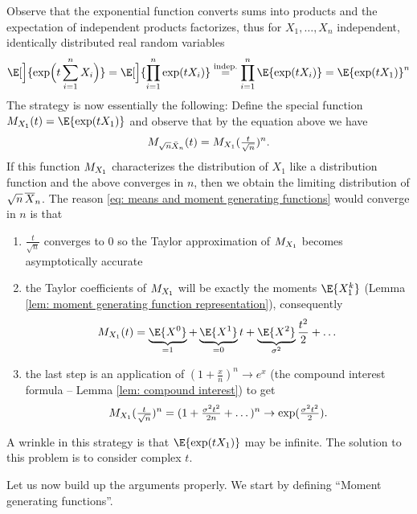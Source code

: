Observe that the exponential function converts sums into products and the
expectation of independent products factorizes, thus for \(X_1,\dots, X_n\)
independent, identically distributed real random variables
\[
    \E[\Big]{\exp\Bigl(t\sum_{i=1}^n X_i\Bigr)} = \E[\Big]{\prod_{i=1}^n \exp(tX_i)}
    \overset{\text{indep.}}= \prod_{i=1}^n \E{\exp(tX_i)}
    = \E{\exp(tX_1)}^n
\]
The strategy is now essentially the following: Define the special function
\(\MGF_{X_1}(t) = \E{\exp(t X_1)}\) and observe that
by the equation above we have
\begin{equation}
    \label{eq: means and moment generating functions}    
    M_{\sqrt{n} \bar{X}_n}(t) = M_{X_1}(\tfrac{t}{\sqrt{n}})^n.
\end{equation}
If this function \(M_{X_1}\) characterizes the distribution of \(X_1\) like a
distribution function and the above converges in \(n\), then we obtain the
limiting distribution of \(\sqrt{n}\,\overline{X}_n\). The reason \eqref{eq: means
and moment generating functions} would converge in \(n\) is that
\begin{enumerate}[label=\textbf{Step \arabic*:},itemindent=2em]
    \item \(\frac{t}{\sqrt{n}}\) converges to \(0\) so the Taylor approximation
    of \(M_{X_1}\) becomes asymptotically accurate 
    \item the Taylor coefficients of \(M_{X_1}\) will be exactly the moments
    \(\E{X_1^k}\) (Lemma \ref{lem: moment generating function representation}), consequently
    \[
        \MGF_{X_1}(t) = \underbrace{\E{X^0}}_{=1} + \underbrace{\E{X^1}}_{=0} t + \underbrace{\E{X^2}}_{\sigma^2} \frac{t^2}{2} + \dots
    \]
    \item the last step is an application of \((1+\frac{x}n)^n \to e^x\) (the
    compound interest formula -- Lemma \ref{lem: compound interest}) to get
    \[
        M_{X_1}(\tfrac{t}{\sqrt{n}})^n
        = (1 + \tfrac{\sigma^2 t^2}{2n} + \dots)^n \to \exp(\tfrac{\sigma^2 t^2}2).
    \]
\end{enumerate}
A wrinkle in this strategy is that \(\E{\exp(tX_1)}\) may be infinite. The
solution to this problem is to consider complex \(t\).

Let us now build up the arguments properly. We start by
defining ``Moment generating functions''.

